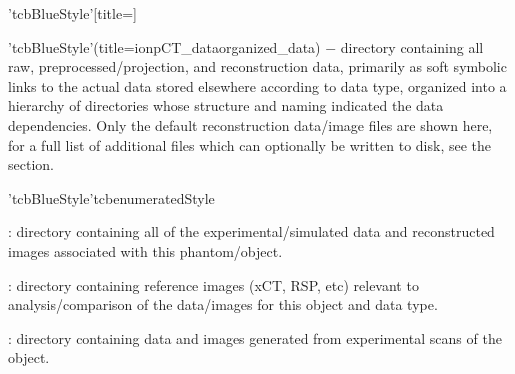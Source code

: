 \begin{tcbenvironment}'tcbBlueStyle'[title=]%
\begin{tcbparagraph}'tcbBlueStyle'(title=\dirsep ion\dirsep pCT\_data\dirsep organized\_data)%
$\boldsymbol{-}$ directory containing all raw, preprocessed/projection, and reconstruction data, primarily as soft symbolic links to the actual data stored elsewhere according to data type, organized into a hierarchy of directories whose structure and naming indicated the data dependencies.  Only the default reconstruction data/image files are shown here, for a full list of additional files which can optionally be written to disk, see the  section.
\end{tcbparagraph}
\begin{tcbparagraph}'tcbBlueStyle'{tcbenumeratedStyle}
    \begin{ThinEnum}
        \item {} : directory containing all of the experimental/simulated data and reconstructed images associated with this phantom/object.
        \begin{ThinEnum}
            \item {} : directory containing reference images (xCT, RSP, etc) relevant to analysis/comparison of the data/images for this object and data type.
            \item {} : directory containing data and images generated from experimental scans of the object.
            \begin{ThinEnum}

\end{ThinEnum}
\end{ThinEnum}
\end{ThinEnum}
\end{tcbparagraph}
\end{tcbenvironment}
